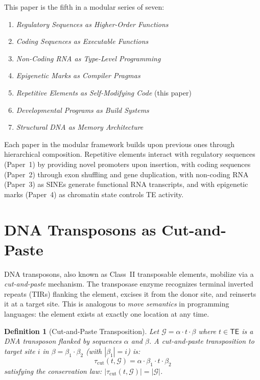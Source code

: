 \documentclass[12pt,a4paper]{article}
\newtheorem{definition}[theorem]{Definition}
\newcommand{\Genome}{\mathcal{G}}
\newcommand{\TE}{\mathsf{TE}}
\begin{document}
This paper is the fifth in a modular series of seven:
\begin{enumerate}[label=\textbf{Paper \arabic*:}]
  \item \textit{Regulatory Sequences as Higher-Order Functions}
  \item \textit{Coding Sequences as Executable Functions}
  \item \textit{Non-Coding RNA as Type-Level Programming}
  \item \textit{Epigenetic Marks as Compiler Pragmas}
  \item \textit{Repetitive Elements as Self-Modifying Code} (this paper)
  \item \textit{Developmental Programs as Build Systems}
  \item \textit{Structural DNA as Memory Architecture}
\end{enumerate}

Each paper in the modular framework builds upon previous ones through hierarchical
composition. Repetitive elements interact with regulatory sequences (Paper~1) by
providing novel promoters upon insertion, with coding sequences (Paper~2) through
exon shuffling and gene duplication, with non-coding RNA (Paper~3) as SINEs generate
functional RNA transcripts, and with epigenetic marks (Paper~4) as chromatin state
controls TE activity.


\section{DNA Transposons as Cut-and-Paste}\label{sec:cut-paste}

DNA transposons, also known as Class~II transposable elements, mobilize via a
\emph{cut-and-paste} mechanism. The transposase enzyme recognizes terminal inverted
repeats (TIRs) flanking the element, excises it from the donor site, and reinserts
it at a target site. This is analogous to \emph{move semantics} in programming languages:
the element exists at exactly one location at any time.

\begin{definition}[Cut-and-Paste Transposition]\label{def:cut-paste}
Let $\Genome = \alpha \cdot t \cdot \beta$ where $t \in \TE$ is a DNA transposon
flanked by sequences $\alpha$ and $\beta$. A cut-and-paste transposition to target
site $i$ in $\beta = \beta_1 \cdot \beta_2$ (with $|\beta_1| = i$) is:
\[
  \tau_{\mathrm{cut}}(t, \Genome) = \alpha \cdot \beta_1 \cdot t \cdot \beta_2
\]
satisfying the \emph{conservation law}: $|\tau_{\mathrm{cut}}(t, \Genome)| = |\Genome|$.
\end{definition}
\end{document}
